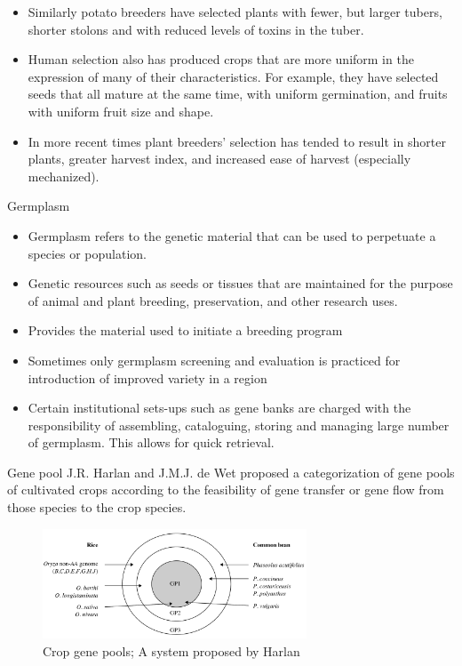 \documentclass[11pt,ignorenonframetext,aspectratio=169]{beamer}
\providecommand{\tightlist}{%
  \setlength{\itemsep}{0pt}\setlength{\parskip}{0pt}}
\begin{document}
\begin{frame}{}
\protect\hypertarget{section-3}{}
\begin{itemize}
\item
  Similarly potato breeders have selected plants with fewer, but larger
  tubers, shorter stolons and with reduced levels of toxins in the
  tuber.
\item
  Human selection also has produced crops that are more uniform in the
  expression of many of their characteristics. For example, they have
  selected seeds that all mature at the same time, with uniform
  germination, and fruits with uniform fruit size and shape.
\item
  In more recent times plant breeders' selection has tended to result in
  shorter plants, greater harvest index, and increased ease of harvest
  (especially mechanized).
\end{itemize}
\end{frame}

\begin{frame}{Germplasm}
\protect\hypertarget{germplasm}{}
\begin{itemize}
\tightlist
\item
  Germplasm refers to the genetic material that can be used to
  perpetuate a species or population.
\item
  Genetic resources such as seeds or tissues that are maintained for the
  purpose of animal and plant breeding, preservation, and other research
  uses.
\item
  Provides the material used to initiate a breeding program
\item
  Sometimes only germplasm screening and evaluation is practiced for
  introduction of improved variety in a region
\item
  Certain institutional sets-ups such as gene banks are charged with the
  responsibility of assembling, cataloguing, storing and managing large
  number of germplasm. This allows for quick retrieval.
\end{itemize}
\end{frame}

\begin{frame}{Gene pool}
\protect\hypertarget{gene-pool}{}
J.R. Harlan and J.M.J. de Wet proposed a categorization of gene pools of
cultivated crops according to the feasibility of gene transfer or gene
flow from those species to the crop species.

\begin{figure}
\includegraphics[width=0.7\textwidth, keepaspectratio,height=0.6\textheight]{./images/crop_gene_pools} \caption{Crop gene pools; A system proposed by Harlan}\label{fig:gene-pools}
\end{figure}
\end{frame}
\end{document}
